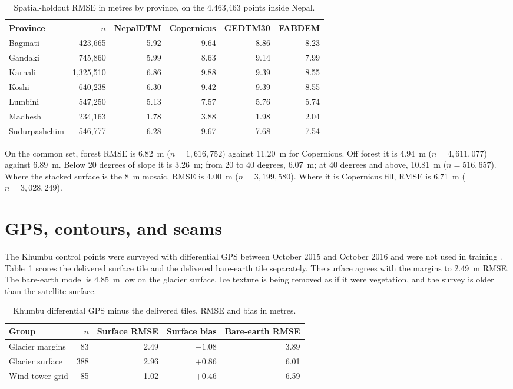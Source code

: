 \documentclass[11pt]{article}
\begin{document}
\begin{table}[ht]
  \centering
  \caption{Spatial-holdout RMSE in metres by province, on the 4,463,463 points inside Nepal.}
  \begin{tabular}{@{}lrrrrr@{}}
    \toprule
    Province & $n$ & NepalDTM & Copernicus & GEDTM30 & FABDEM \\
    \midrule
    Bagmati & 423,665 & 5.92 & 9.64 & 8.86 & 8.23 \\
    Gandaki & 745,860 & 5.99 & 8.63 & 9.14 & 7.99 \\
    Karnali & 1,325,510 & 6.86 & 9.88 & 9.39 & 8.55 \\
    Koshi & 640,238 & 6.30 & 9.42 & 9.39 & 8.55 \\
    Lumbini & 547,250 & 5.13 & 7.57 & 5.76 & 5.74 \\
    Madhesh & 234,163 & 1.78 & 3.88 & 1.98 & 2.04 \\
    Sudurpashchim & 546,777 & 6.28 & 9.67 & 7.68 & 7.54 \\
    \bottomrule
  \end{tabular}
\end{table}

On the common set, forest RMSE is 6.82~m ($n=1{,}616{,}752$) against 11.20~m for Copernicus.
Off forest it is 4.94~m ($n=4{,}611{,}077$) against 6.89~m.
Below 20 degrees of slope it is 3.26~m; from 20 to 40 degrees, 6.07~m; at 40 degrees and above, 10.81~m ($n=516{,}657$).
Where the stacked surface is the 8~m mosaic, RMSE is 4.00~m ($n=3{,}199{,}580$).
Where it is Copernicus fill, RMSE is 6.71~m ($n=3{,}028{,}249$).

\section{GPS, contours, and seams}

The Khumbu control points were surveyed with differential GPS between October 2015 and October 2016 and were not used in training \citep{quincey2016khumbu}.
Table~\ref{tab:dgps} scores the delivered surface tile and the delivered bare-earth tile separately.
The surface agrees with the margins to 2.49~m RMSE.
The bare-earth model is 4.85~m low on the glacier surface.
Ice texture is being removed as if it were vegetation, and the survey is older than the satellite surface.

\begin{table}[ht]
  \centering
  \caption{Khumbu differential GPS minus the delivered tiles. RMSE and bias in metres.}
  \label{tab:dgps}
  \begin{tabular}{@{}lrrrr@{}}
    \toprule
    Group & $n$ & Surface RMSE & Surface bias & Bare-earth RMSE \\
    \midrule
    Glacier margins & 83 & 2.49 & $-1.08$ & 3.89 \\
    Glacier surface & 388 & 2.96 & $+0.86$ & 6.01 \\
    Wind-tower grid & 85 & 1.02 & $+0.46$ & 6.59 \\
    \bottomrule
  \end{tabular}
\end{table}
\end{document}
